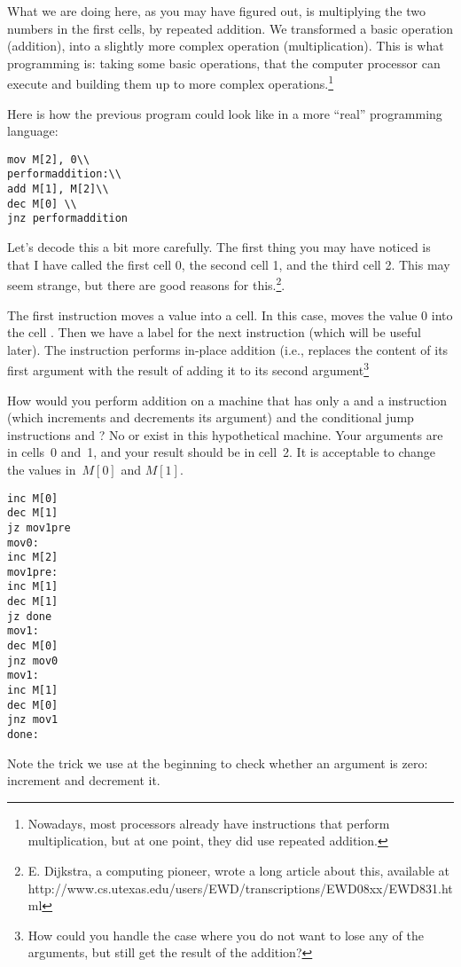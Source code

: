 What we are doing here, as you may have figured out, is multiplying the two
numbers in the first cells, by repeated addition. We transformed a basic
operation (addition), into a slightly more complex operation (multiplication).
This is what programming is: taking some basic operations, that the computer
processor can execute and building them up to more complex
operations.\footnote{Nowadays, most processors already have instructions that
perform multiplication, but at one point, they did use repeated addition.}

Here is how the previous program could look like in a more ``real'' programming
language:

\begin{verbatim}
mov M[2], 0\\
performaddition:\\
add M[1], M[2]\\
dec M[0] \\
jnz performaddition
\end{verbatim}

Let's decode this a bit more carefully. The first thing you may have noticed is
that I have called the first cell 0, the second cell 1, and the third cell 2.
This may seem strange, but there are good reasons for this.\footnote{
E. Dijkstra, a computing pioneer, wrote a long article about this, available at
http://www.cs.utexas.edu/users/EWD/transcriptions/EWD08xx/EWD831.html}.

The first instruction  moves a value into a cell. In this
case, moves the value 0 into the cell . Then we have a label
for the next instruction (which will be useful later). The 
instruction performs in-place addition (i.e., replaces the content of its first
argument with the result of adding it to its second argument\footnote{How could
you handle the case where you do not want to lose any of the arguments, but
still get the result of the addition? }

\begin{exercise}
How would you perform addition on a machine that has only a 
and a  instruction (which increments and decrements its
argument) and the conditional jump instructions  and
? No  or  exist in this
hypothetical machine. Your arguments are in cells~0 and~1, and your result
should be in cell~2. It is acceptable to change the values in~$M[0]$ and
$M[1]$.
\begin{solution}
\begin{verbatim}
inc M[0]
dec M[1]
jz mov1pre
mov0:
inc M[2]
mov1pre:
inc M[1]
dec M[1]
jz done
mov1:
dec M[0]
jnz mov0
mov1:
inc M[1]
dec M[0]
jnz mov1
done:
\end{verbatim}

Note the trick we use at the beginning to check whether an argument is zero:
increment and decrement it.
\end{solution}
\end{exercise}

